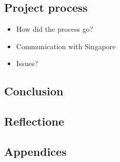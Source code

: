 \documentclass[11pt]{article}
\begin{document}
\subsection{Project process}
\label{sec-1-5}

\begin{itemize}
\item How did the process go?
\item Communication with Singapore
\item Issues?
\end{itemize}
\subsection{Conclusion}
\label{sec-1-6}
\subsection{Reflectione}
\label{sec-1-7}
\subsection{Appendices}
\label{sec-1-8}
\end{document}
